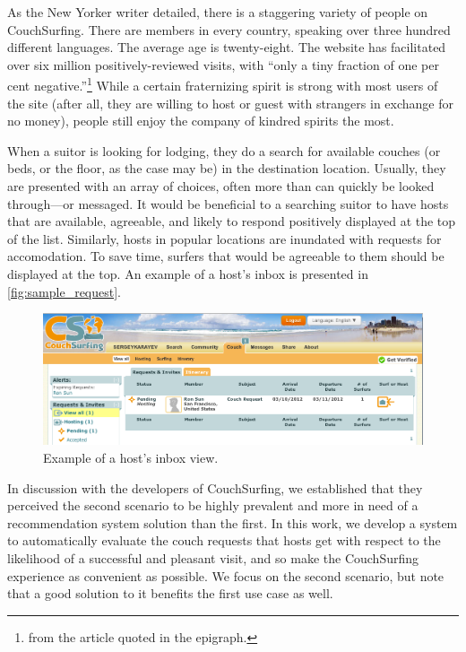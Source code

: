 As the New Yorker writer detailed, there is a staggering variety of people on CouchSurfing.
There are members in every country, speaking over three hundred different languages.
The average age is twenty-eight.
The website has facilitated over six million positively-reviewed visits, with ``only a tiny fraction of one per cent negative.''\footnote{from the article quoted in the epigraph.}
While a certain fraternizing spirit is strong with most users of the site (after all, they are willing to host or guest with strangers in exchange for no money), people still enjoy the company of kindred spirits the most.

When a suitor is looking for lodging, they do a search for available couches (or beds, or the floor, as the case may be) in the destination location.
Usually, they are presented with an array of choices, often more than can quickly be looked through---or messaged.
It would be beneficial to a searching suitor to have hosts that are available, agreeable, and likely to respond positively displayed at the top of the list.
Similarly, hosts in popular locations are inundated with requests for accomodation.
To save time, surfers that would be agreeable to them should be displayed at the top.
An example of a host's inbox is presented in \autoref{fig:sample_request}.

\begin{figure}[ht]
\centering
\includegraphics[width=1\linewidth]{figures/screenshots/requests.png}
\caption{Example of a host's inbox view.}
\label{fig:sample_request}
\end{figure}

In discussion with the developers of CouchSurfing, we established that they perceived the second scenario to be highly prevalent and more in need of a recommendation system solution than the first.
In this work, we develop a system to automatically evaluate the couch requests that hosts get with respect to the likelihood of a successful and pleasant visit, and so make the CouchSurfing experience as convenient as possible.
We focus on the second scenario, but note that a good solution to it benefits the first use case as well.